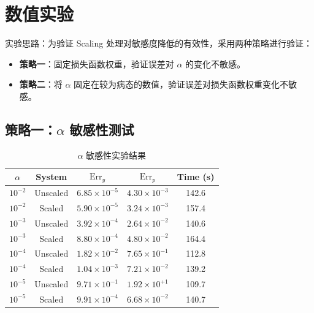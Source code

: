 \documentclass[UTF8, 12pt]{ctexart}
\begin{document}
\section{数值实验}
\label{sec:experiments}

实验思路：为验证 Scaling 处理对敏感度降低的有效性，采用两种策略进行验证：
\begin{itemize}
  \item \textbf{策略一}：固定损失函数权重，验证误差对 $\alpha$ 的变化不敏感。
  \item \textbf{策略二}：将 $\alpha$ 固定在较为病态的数值，验证误差对损失函数权重变化不敏感。
\end{itemize}

\subsection{策略一：$\alpha$ 敏感性测试}
\label{subsec:alpha-sensitivity}

\begin{table}[H]
  \centering
  \caption{$\alpha$ 敏感性实验结果}
  \label{tab:alpha-sensitivity}
  \begin{tabular}{ccccc}
    \toprule
    $\alpha$ & System   & $\mathrm{Err}_y$ & $\mathrm{Err}_p$ & Time (s) \\
    \midrule
    $10^{-2}$ & Unscaled & $6.85\times10^{-5}$  & $4.30\times10^{-3}$  & 142.6 \\
    $10^{-2}$ & Scaled   & $5.90\times10^{-5}$  & $3.24\times10^{-3}$  & 157.4 \\
    \midrule
    $10^{-3}$ & Unscaled & $3.92\times10^{-4}$  & $2.64\times10^{-2}$  & 140.6 \\
    $10^{-3}$ & Scaled   & $8.80\times10^{-4}$  & $4.80\times10^{-2}$  & 164.4 \\
    \midrule
    $10^{-4}$ & Unscaled & $1.82\times10^{-2}$  & $7.65\times10^{-1}$  & 112.8 \\
    $10^{-4}$ & Scaled   & $1.04\times10^{-3}$  & $7.21\times10^{-2}$  & 139.2 \\
    \midrule
    $10^{-5}$ & Unscaled & $9.71\times10^{-1}$  & $1.92\times10^{+1}$  & 109.7 \\
    $10^{-5}$ & Scaled   & $9.91\times10^{-4}$  & $6.68\times10^{-2}$  & 140.7 \\
    \bottomrule
  \end{tabular}
\end{table}
\end{document}
